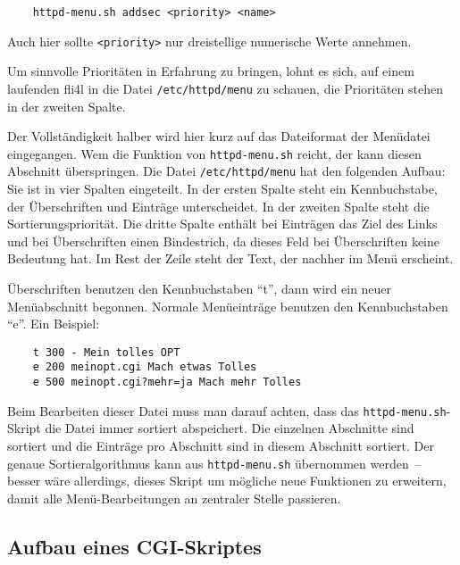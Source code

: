\begin{example}
\begin{verbatim}
    httpd-menu.sh addsec <priority> <name>
\end{verbatim}
\end{example}

Auch hier sollte \texttt{<priority>} nur dreistellige numerische Werte annehmen.

Um sinnvolle Prioritäten in Erfahrung zu bringen, lohnt es sich, auf
einem laufenden fli4l in die Datei \texttt{/etc/httpd/menu} zu schauen, die
Prioritäten stehen in der zweiten Spalte.

Der Vollständigkeit halber wird hier kurz auf das Dateiformat der Menüdatei
eingegangen. Wem die Funktion von \texttt{httpd-menu.sh} reicht, der kann diesen
Abschnitt überspringen. Die Datei \texttt{/etc/httpd/menu} hat den folgenden
Aufbau: Sie ist in vier Spalten eingeteilt. In der ersten Spalte steht ein
Kennbuchstabe, der Überschriften und Einträge unterscheidet. In der zweiten
Spalte steht die Sortierungspriorität. Die dritte Spalte enthält bei Einträgen
das Ziel des Links und bei Überschriften einen Bindestrich, da dieses Feld bei
Überschriften keine Bedeutung hat. Im Rest der Zeile steht der Text, der
nachher im Menü erscheint.

Überschriften benutzen den Kennbuchstaben "`t"', dann wird ein neuer
Menüabschnitt begonnen. Normale Menüeinträge benutzen den Kennbuchstaben "`e"'.
Ein Beispiel:

\begin{example}
\begin{verbatim}
    t 300 - Mein tolles OPT
    e 200 meinopt.cgi Mach etwas Tolles
    e 500 meinopt.cgi?mehr=ja Mach mehr Tolles
\end{verbatim}
\end{example}

Beim Bearbeiten dieser Datei muss man darauf achten, dass das
\texttt{httpd-menu.sh}-Skript die Datei immer sortiert abspeichert. Die
einzelnen Abschnitte sind sortiert und die Einträge pro Abschnitt sind in diesem
Abschnitt sortiert. Der genaue Sortieralgorithmus kann aus
\texttt{httpd-menu.sh} übernommen werden~-- besser wäre allerdings, dieses
Skript um mögliche neue Funktionen zu erweitern, damit alle Menü-Bearbeitungen
an zentraler Stelle passieren.

\subsection{Aufbau eines CGI-Skriptes}

